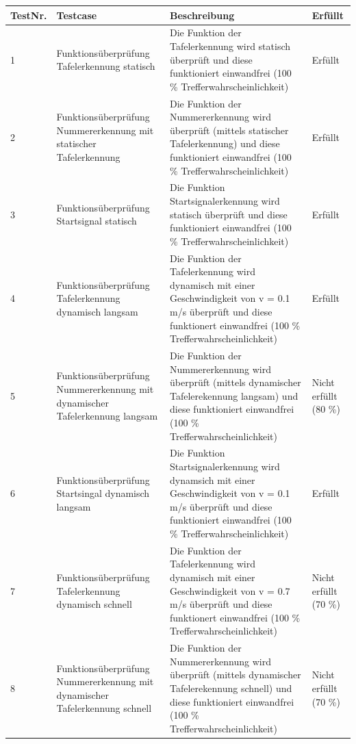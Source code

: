 \documentclass[../../main.tex]{subfiles}
\begin{document}
\begin{landscape}
\begin{table}[H] %
  \begin{flushleft}
      \begin{tabular}{|l|p{6cm}|p{11cm}|l|}
          \hline
          \textbf{TestNr.} & \textbf{Testcase}                            & \textbf{Beschreibung}                       & \textbf{Erfüllt}\\\hline
          1                & Funktionsüberprüfung Tafelerkennung statisch & Die Funktion der Tafelerkennung wird statisch überprüft und diese funktioniert einwandfrei (100 \% Trefferwahrscheinlichkeit) & Erfüllt \\\hline
          2 & Funktionsüberprüfung Nummererkennung mit statischer Tafelerkennung & Die Funktion der Nummererkennung wird überprüft (mittels statischer Tafelerkennung) und diese funktioniert einwandfrei (100 \% Trefferwahrscheinlichkeit) & Erfüllt \\\hline
          3 & Funktionsüberprüfung Startsignal statisch & Die Funktion Startsignalerkennung wird statisch überprüft und diese funktioniert einwandfrei (100 \% Trefferwahrscheinlichkeit) & Erfüllt \\\hline
          4 & Funktionsüberprüfung Tafelerkennung dynamisch langsam & Die Funktion der Tafelerkennung wird dynamisch mit einer Geschwindigkeit von v = 0.1 m/s  überprüft und diese funktionert einwandfrei (100 \% Trefferwahrscheinlichkeit) & Erfüllt \\\hline
          5 & Funktionsüberprüfung Nummererkennung mit dynamischer Tafelerkennung langsam & Die Funktion der Nummererkennung wird überprüft (mittels dynamischer Tafelerekennung langsam) und diese funktioniert einwandfrei (100 \% Trefferwahrscheinlichkeit) & Nicht erfüllt (80 \%) \\\hline
          6 & Funktionsüberprüfung Startsingal dynamisch langsam & Die Funktion Startsignalerkennung wird dynamsich mit einer Geschwindigkeit von v = 0.1 m/s überprüft und diese funktioniert einwandfrei (100 \% Trefferwahrscheinlichkeit) & Erfüllt \\\hline
          7 & Funktionsüberprüfung Tafelerkennung dynamisch schnell & Die Funktion der Tafelerkennung wird dynamisch mit einer Geschwindigkeit von v = 0.7 m/s  überprüft und diese funktionert einwandfrei (100 \% Trefferwahrscheinlichkeit) & Nicht erfüllt (70 \%) \\\hline
          8 & Funktionsüberprüfung Nummererkennung mit dynamischer Tafelerkennung schnell & Die Funktion der Nummererkennung wird überprüft (mittels dynamischer Tafelerekennung schnell) und diese funktioniert einwandfrei (100 \% Trefferwahrscheinlichkeit) & Nicht erfüllt (70 \%) \\\hline

\end{tabular}
\end{flushleft}
\end{table}
\end{landscape}
\end{document}
